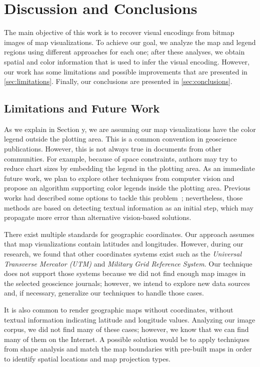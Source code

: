 \chapter{Discussion and Conclusions}
\label{ch:conclusions}
The main objective of this work is to recover visual encodings from bitmap images of map visualizations. To achieve our goal, we analyze the map and legend regions using different approaches for each one; after these analyses, we obtain spatial and color information that is used to infer the visual encoding. However, our work has some limitations and possible improvements that are presented in \autoref{sec:limitations}. Finally, our conclusions are presented in \autoref{sec:conclusions}.

\section{Limitations and Future Work}
\label{sec:limitations}

As we explain in Section y, we are assuming our map visualizations have the color legend outside the plotting area. This is a common convention in geoscience publications. However, this is not always true in documents from other communities. For example, because of space constraints, authors may try to reduce chart sizes by embedding the legend in the plotting area. As an immediate future work, we plan to explore other techniques from computer vision and propose an algorithm supporting color legends inside the plotting area. Previous works had described some options to tackle this problem~\citep{Poco2017a, Siegel2016}; nevertheless, those methods are based on detecting textual information as an initial step, which may propagate more error than alternative vision-based solutions.


There exist multiple standards for geographic coordinates. Our approach assumes that map visualizations contain latitudes and longitudes. However, during our research, we found that other coordinates systems exist such as the \emph{Universal Transverse Mercator (UTM)} and \emph{Military Grid Reference System}. Our technique does not support those systems because we did not find enough map images in the selected geoscience journals; however, we intend to explore new data sources and, if necessary, generalize our techniques to handle those cases. 


It is also common to render geographic maps without coordinates, \ie without textual information indicating latitude and longitude values. Analyzing our image corpus, we did not find many of these cases; however, we know that we can find many of them on the Internet. A possible solution would be to apply techniques from shape analysis and match the map boundaries with pre-built maps in order to identify spatial locations and map projection types. 


